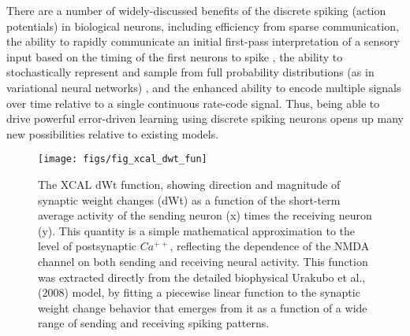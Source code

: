 \documentclass[11pt,twoside]{article}
\newif\myifpdf
\begin{document}
There are a number of widely-discussed benefits of the discrete spiking (action potentials) in biological neurons, including efficiency from sparse communication, the ability to rapidly communicate an initial first-pass interpretation of a sensory input based on the timing of the first neurons to spike \citep{ThorpeDelormeVanRullen01}, the ability to stochastically represent and sample from full probability distributions (as in variational neural networks) \citep{McKeeCrandellChaudhuriEtAl21,etc}, and the enhanced ability to encode multiple signals over time relative to a single continuous rate-code signal.  Thus, being able to drive powerful error-driven learning using discrete spiking neurons opens up many new possibilities relative to existing models.

\begin{figure}
  \centering\texttt{[image: figs/fig\_xcal\_dwt\_fun]}
  \caption{\footnotesize The XCAL dWt function, showing direction and magnitude of synaptic weight changes (dWt) as a function of the short-term average activity of the sending neuron (x) times the receiving neuron (y). This quantity is a simple mathematical approximation to the level of postsynaptic $Ca^{++}$, reflecting the dependence of the NMDA channel on both sending and receiving neural activity. This function was extracted directly from the detailed biophysical Urakubo et al., (2008) model, by fitting a piecewise linear function to the synaptic weight change behavior that emerges from it as a function of a wide range of sending and receiving spiking patterns.}
  \label{fig.xcal}
\end{figure}
\end{document}
